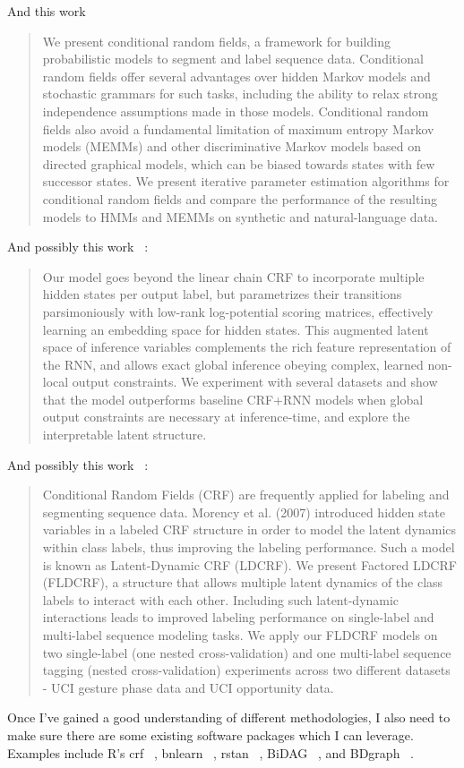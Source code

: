 \documentclass[a4paper, 11pt]{report}
\begin{document}
	And this work ~\cite{lafferty2001}
	
	\begin{quote}
		We present conditional random fields, a framework for building probabilistic models to segment and label
		sequence data. Conditional random fields offer several advantages over hidden Markov models and
		stochastic grammars for such tasks, including the ability to relax strong independence assumptions
		made in those models. Conditional random fields also avoid a fundamental limitation of maximum
		entropy Markov models (MEMMs) and other discriminative Markov models based on directed graphical
		models, which can be biased towards states with few successor states. We present iterative parameter
		estimation algorithms for conditional random fields and compare the performance of the resulting
		models to HMMs and MEMMs on synthetic and natural-language data.
	\end{quote}

	And possibly this work ~\cite{thai2018}:
	
	\begin{quote}
		 Our model goes beyond the linear chain CRF to incorporate multiple hidden states per output label, but parametrizes their transitions parsimoniously with low-rank log-potential scoring matrices, effectively learning an embedding space for hidden states. This augmented latent space of inference variables complements the rich feature representation of the RNN, and allows exact global inference obeying complex, learned non-local output constraints. We experiment with several datasets and show that the model outperforms baseline CRF+RNN models when global output constraints are necessary at inference-time, and explore the interpretable latent structure. 
	\end{quote}

	And possibly this work ~\cite{neogi2019}:
	
	\begin{quote}
		Conditional Random Fields (CRF) are frequently applied for labeling and segmenting sequence data. Morency et al. (2007) introduced hidden state variables in a labeled CRF structure in order to model the latent dynamics within class labels, thus improving the labeling performance. Such a model is known as Latent-Dynamic CRF (LDCRF). We present Factored LDCRF (FLDCRF), a structure that allows multiple latent dynamics of the class labels to interact with each other. Including such latent-dynamic interactions leads to improved labeling performance on single-label and multi-label sequence modeling tasks. We apply our FLDCRF models on two single-label (one nested cross-validation) and one multi-label sequence tagging (nested cross-validation) experiments across two different datasets - UCI gesture phase data and UCI opportunity data.
	\end{quote}

	Once I've gained a good understanding of different methodologies, I also need to make sure there are some existing software packages which I can leverage. Examples include R's crf ~\cite{ling2019}, bnlearn ~\cite{scutari2021}, rstan ~\cite{guo2021}, BiDAG ~\cite{suter2021}, and BDgraph ~\cite{mohammadi2021}.

\printbibliography[title={Bibliography}]
\end{document}
